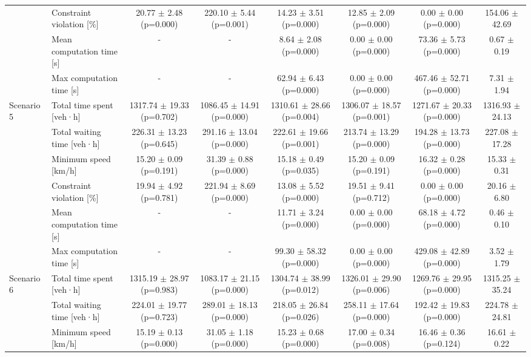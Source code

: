 \begin{table}[htbp]
{\begin{tabular}{llcccccc}
 & Constraint violation [\%] & 20.77 $\pm$ 2.48 (p=0.000) & 220.10 $\pm$ 5.44 (p=0.001) & 14.23 $\pm$ 3.51 (p=0.000) & 12.85 $\pm$ 2.09 (p=0.000) & 0.00 $\pm$ 0.00 (p=0.000) & 154.06 $\pm$ 42.69 \\
 & Mean computation time [s] & - & - & 8.64 $\pm$ 2.08 (p=0.000) & 0.00 $\pm$ 0.00 (p=0.000) & 73.36 $\pm$ 5.73 (p=0.000) & 0.67 $\pm$ 0.19 \\
 & Max computation time [s] & - & - & 62.94 $\pm$ 6.43 (p=0.000) & 0.00 $\pm$ 0.00 (p=0.000) & 467.46 $\pm$ 52.71 (p=0.000) & 7.31 $\pm$ 1.94 \\
\midrule
Scenario 5 & Total time spent [veh·h] & 1317.74 $\pm$ 19.33 (p=0.702) & 1086.45 $\pm$ 14.91 (p=0.000) & 1310.61 $\pm$ 28.66 (p=0.004) & 1306.07 $\pm$ 18.57 (p=0.001) & 1271.67 $\pm$ 20.33 (p=0.000) & 1316.93 $\pm$ 24.13 \\
 & Total waiting time [veh·h] & 226.31 $\pm$ 13.23 (p=0.645) & 291.16 $\pm$ 13.04 (p=0.000) & 222.61 $\pm$ 19.66 (p=0.001) & 213.74 $\pm$ 13.29 (p=0.000) & 194.28 $\pm$ 13.73 (p=0.000) & 227.08 $\pm$ 17.28 \\
 & Minimum speed [km/h] & 15.20 $\pm$ 0.09 (p=0.191) & 31.39 $\pm$ 0.88 (p=0.000) & 15.18 $\pm$ 0.49 (p=0.035) & 15.20 $\pm$ 0.09 (p=0.191) & 16.32 $\pm$ 0.28 (p=0.000) & 15.33 $\pm$ 0.31 \\
 & Constraint violation [\%] & 19.94 $\pm$ 4.92 (p=0.781) & 221.94 $\pm$ 8.69 (p=0.000) & 13.08 $\pm$ 5.52 (p=0.000) & 19.51 $\pm$ 9.41 (p=0.712) & 0.00 $\pm$ 0.00 (p=0.000) & 20.16 $\pm$ 6.80 \\
 & Mean computation time [s] & - & - & 11.71 $\pm$ 3.24 (p=0.000) & 0.00 $\pm$ 0.00 (p=0.000) & 68.18 $\pm$ 4.72 (p=0.000) & 0.46 $\pm$ 0.10 \\
 & Max computation time [s] & - & - & 99.30 $\pm$ 58.32 (p=0.000) & 0.00 $\pm$ 0.00 (p=0.000) & 429.08 $\pm$ 42.89 (p=0.000) & 3.52 $\pm$ 1.79 \\
\midrule
Scenario 6 & Total time spent [veh·h] & 1315.19 $\pm$ 28.97 (p=0.983) & 1083.17 $\pm$ 21.15 (p=0.000) & 1304.74 $\pm$ 38.99 (p=0.012) & 1326.01 $\pm$ 29.90 (p=0.006) & 1269.76 $\pm$ 29.95 (p=0.000) & 1315.25 $\pm$ 35.24 \\
 & Total waiting time [veh·h] & 224.01 $\pm$ 19.77 (p=0.723) & 289.01 $\pm$ 18.13 (p=0.000) & 218.05 $\pm$ 26.84 (p=0.026) & 258.11 $\pm$ 17.64 (p=0.000) & 192.42 $\pm$ 19.83 (p=0.000) & 224.78 $\pm$ 24.81 \\
 & Minimum speed [km/h] & 15.19 $\pm$ 0.13 (p=0.000) & 31.05 $\pm$ 1.18 (p=0.000) & 15.23 $\pm$ 0.68 (p=0.000) & 17.00 $\pm$ 0.34 (p=0.008) & 16.46 $\pm$ 0.36 (p=0.124) & 16.61 $\pm$ 0.22 \\

\end{tabular}}
\end{table}

